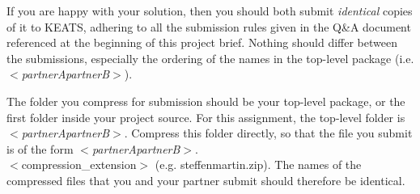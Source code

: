 \documentclass[11pt]{article}
\begin{document}
If you are happy with your solution, then you should both submit \emph{identical} copies of it to KEATS, adhering to all the submission rules given in the Q\&A document referenced at the beginning of this project brief. Nothing should differ between the submissions, especially the ordering of the names in the top-level package (i.e. $<$\emph{partnerApartnerB}$>$).

The folder you compress for submission should be your top-level package, or the first folder inside your project source. For this assignment, the top-level folder is $<$\emph{partnerApartnerB}$>$. Compress this folder directly, so that the file you submit is of the form $<$\emph{partnerApartnerB}$>$.\\ $<$compression\_extension$>$ (e.g. steffenmartin.zip). The names of the compressed files that you and your partner submit should therefore be identical.
\end{document}
